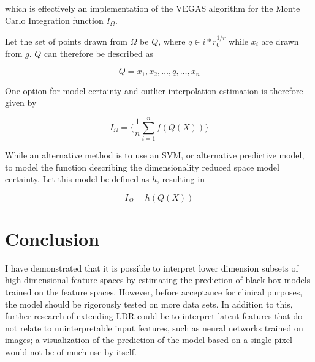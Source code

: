 \documentclass[a4paper, twocolumn]{article}
\begin{document}
which is effectively an implementation of the VEGAS algorithm for the Monte Carlo Integration function $I_\Omega$.

Let the set of points drawn from $\Omega$ be $Q$, where $q \in {i*r}^{1/r}_0$ while $x_i$ are drawn from $g$. $Q$ can therefore be described as

$$Q = {x_1, x_2, \ldots, q, \ldots, x_n}$$

One option for model certainty and outlier interpolation estimation is therefore given by

$$I_\Omega = \{\frac{1}{n} \sum^n_{i=1} f(Q(X))\}$$

While an alternative method is to use an SVM, or alternative predictive model, to model the function describing the dimensionality reduced space model certainty. Let this model be defined as $h$, resulting in

$$I_\Omega = h(Q(X))$$

\section{Conclusion}\label{Conclusion}

I have demonstrated that it is possible to interpret lower dimension subsets of high dimensional feature spaces by estimating the prediction of black box models trained on the feature spaces. However, before acceptance for clinical purposes, the model should be rigorously tested on more data sets. In addition to this, further research of extending LDR could be to interpret latent features that do not relate to uninterpretable input features, such as neural networks trained on images; a visualization of the prediction of the model based on a single pixel would not be of much use by itself.

\printbibliography
\end{document}
